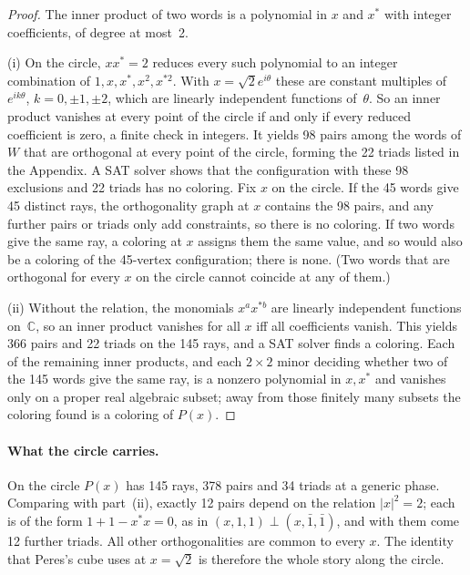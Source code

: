 \documentclass[11pt,a4paper]{article}
\theoremstyle{remark}
\newcommand{\C}{\mathbb{C}}
\begin{document}
\begin{proof}
The inner product of two words is a polynomial in $x$ and $x^{*}$ with integer coefficients, of
degree at most~2.

(i)  On the circle, $x x^{*}=2$ reduces every such polynomial to an integer combination of
$1,x,x^{*},x^2,x^{*2}$.  With $x=\sqrt2e^{i\theta}$ these are constant multiples of
$e^{ik\theta}$, $k=0,\pm1,\pm2$, which are linearly independent functions of~$\theta$.  So an
inner product vanishes at every point of the circle if and only if every reduced coefficient is
zero, a finite check in integers.  It yields 98 pairs among the words of $W$ that are orthogonal
at every point of the circle, forming the 22 triads listed in the Appendix.  A SAT solver shows
that the configuration with these 98 exclusions and 22 triads has no coloring.  Fix $x$ on the
circle.  If the 45 words give 45 distinct rays, the orthogonality graph at $x$ contains the 98
pairs, and any further pairs or triads only add constraints, so there is no coloring.  If two
words give the same ray, a coloring at $x$ assigns them the same value, and so would also be a
coloring of the 45-vertex configuration; there is none.  (Two words that are orthogonal for every
$x$ on the circle cannot coincide at any of them.)

(ii)  Without the relation, the monomials $x^ax^{*b}$ are linearly independent functions on~$\C$,
so an inner product vanishes for all $x$ iff all coefficients vanish.  This yields 366 pairs and
22 triads on the 145 rays, and a SAT solver finds a coloring.  Each of the remaining inner
products, and each $2\times2$ minor deciding whether two of the 145 words give the same ray, is a
nonzero polynomial in $x,x^{*}$ and vanishes only on a proper real algebraic subset; away from
those finitely many subsets the coloring found is a coloring of $P(x)$.
\end{proof}

\begin{table}[t]
\centering
\caption{The 45 words of Theorem~\ref{thm:B}.  A bar is a minus sign and $x^{*}$ is the complex
conjugate: $\bar x^{*}=-x^{*}$.  The list is one critical set found by greedy reduction (every
single deletion is colorable in the generic graph); it is not known to be the smallest.}
\label{tab:words}
\small

\end{table}

\paragraph{What the circle carries.}  On the circle $P(x)$ has 145 rays, 378 pairs and 34
triads at a generic phase.  Comparing with part~(ii), exactly 12 pairs depend on the relation
$|x|^2=2$; each is of the form $1+1-x^{*}x=0$, as in $(x,1,1)\perp(x,\bar1,\bar1)$, and with
them come 12 further triads.  All other orthogonalities are common to every $x$.  The identity that Peres's
cube uses at $x=\sqrt2$ is therefore the whole story along the circle.
\end{document}
